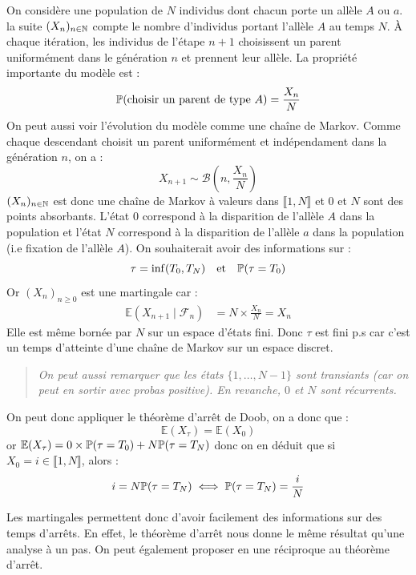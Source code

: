 \begin{example}
    On considère une population de $N$ individus dont chacun porte un allèle 
    $A$ ou $a$. la suite $(X_n)_{n \in \mathbb{N}}$ compte le nombre d'individus portant l'allèle 
    $A$ au temps $N$. À chaque itération, les individus de l'étape $n+1$ choisissent 
    un parent uniformément dans le génération $n$ et prennent leur allèle. 
    La propriété importante du modèle est : 
        $$ \mathbb{P}( \text{choisir un parent de type } A ) = \frac{X_n}{N} $$ 
    On peut aussi voir l'évolution du modèle comme une chaîne de Markov.
    Comme chaque descendant choisit un parent uniformément et indépendament 
    dans la génération $n$, on a : 
        $$ X_{n+1} \sim \mathcal{B} \left(n, \frac{X_n}{N} \right) $$ 
    $(X_n)_{n \in \mathbb{N}}$ est donc une chaîne de Markov à valeurs dans $ \llbracket 1, N \rrbracket$
    et $0$ et $N$ sont des points absorbants. L'état $0$ correspond à la disparition 
    de l'allèle $A$ dans la population et l'état $N$ correspond à la disparition de l'allèle $a$
    dans la population (i.e fixation de l'allèle $A$).
    On souhaiterait avoir des informations sur : 
        $$ \tau = \inf (T_0, T_N) \quad \text{et} \quad \mathbb{P}( \tau = T_0)$$ 
    Or $(X_n)_{n \geqslant 0}$ est une martingale car : 
        \begin{align*}
            \mathbb{E}(X_{n+1} \mid \mathcal{F}_n) &= N \times \frac{X_n}{N} = X_n 
        \end{align*}
    Elle est même bornée par $N$ sur un espace d'états fini. 
    Donc $ \tau$ est fini p.s car c'est un temps d'atteinte d'une chaîne de Markov 
    sur un espace discret.

    \begin{quote}
        \emph{On peut aussi remarquer que les états $\{1, \dots, N-1\}$ sont transiants 
        (car on peut en sortir avec probas positive). En revanche, $0$ et $N$ 
        sont récurrents.}
    \end{quote}

    On peut donc appliquer le théorème d'arrêt de Doob, on a donc que : 
        $$ \mathbb{E}(X_\tau) = \mathbb{E}(X_0) $$ 
    or $ \mathbb{E}(X_\tau) = 0 \times \mathbb{P}( \tau = T_0) + N \mathbb{P}( \tau = T_N)$ donc 
    on en déduit que si $X_0 = i \in \llbracket 1, N \rrbracket$, alors : 
        $$ i = N \mathbb{P}( \tau = T_N) \iff \mathbb{P}( \tau = T_N) = \frac{i}{N} $$ 
\end{example}

Les martingales permettent donc d'avoir facilement des informations sur des temps d'arrêts. 
En effet, le théorème d'arrêt nous donne le même résultat qu'une analyse à un pas.
On peut également proposer en une réciproque au théorème d'arrêt.

